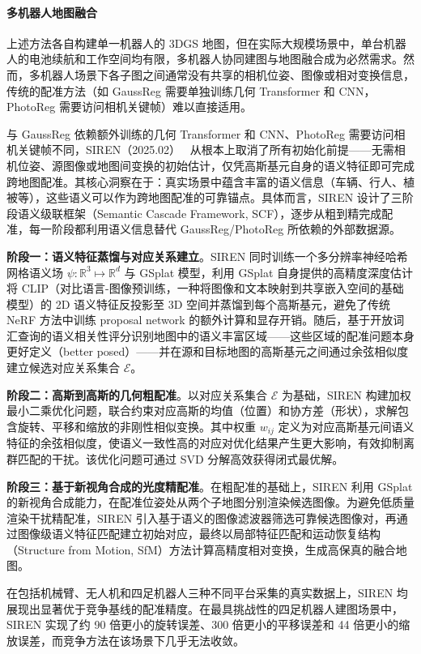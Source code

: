 \paragraph{多机器人地图融合}

上述方法各自构建单一机器人的 3DGS 地图，但在实际大规模场景中，单台机器人的电池续航和工作空间均有限，多机器人协同建图与地图融合成为必然需求。然而，多机器人场景下各子图之间通常没有共享的相机位姿、图像或相对变换信息，传统的配准方法（如 GaussReg 需要单独训练几何 Transformer 和 CNN，PhotoReg 需要访问相机关键帧）难以直接适用。

与 GaussReg 依赖额外训练的几何 Transformer 和 CNN、PhotoReg 需要访问相机关键帧不同，SIREN（2025.02）~\cite{2502_06519} 从根本上取消了所有初始化前提——无需相机位姿、源图像或地图间变换的初始估计，仅凭高斯基元自身的语义特征即可完成跨地图配准。其核心洞察在于：真实场景中蕴含丰富的语义信息（车辆、行人、植被等），这些语义可以作为跨地图配准的可靠锚点。具体而言，SIREN 设计了三阶段语义级联框架（Semantic Cascade Framework, SCF），逐步从粗到精完成配准，每一阶段都利用语义信息替代 GaussReg/PhotoReg 所依赖的外部数据源。

\textbf{阶段一：语义特征蒸馏与对应关系建立}。SIREN 同时训练一个多分辨率神经哈希网格语义场 $\psi: \mathbb{R}^3 \mapsto \mathbb{R}^d$ 与 GSplat 模型，利用 GSplat 自身提供的高精度深度估计将 CLIP（对比语言-图像预训练，一种将图像和文本映射到共享嵌入空间的基础模型）的 2D 语义特征反投影至 3D 空间并蒸馏到每个高斯基元，避免了传统 NeRF 方法中训练 proposal network 的额外计算和显存开销。随后，基于开放词汇查询的语义相关性评分识别地图中的语义丰富区域——这些区域的配准问题本身更好定义（better posed）——并在源和目标地图的高斯基元之间通过余弦相似度建立候选对应关系集合 $\mathcal{E}$。

\textbf{阶段二：高斯到高斯的几何粗配准}。以对应关系集合 $\mathcal{E}$ 为基础，SIREN 构建加权最小二乘优化问题，联合约束对应高斯的均值（位置）和协方差（形状），求解包含旋转、平移和缩放的非刚性相似变换。其中权重 $w_{ij}$ 定义为对应高斯基元间语义特征的余弦相似度，使语义一致性高的对应对优化结果产生更大影响，有效抑制离群匹配的干扰。该优化问题可通过 SVD 分解高效获得闭式最优解。

\textbf{阶段三：基于新视角合成的光度精配准}。在粗配准的基础上，SIREN 利用 GSplat 的新视角合成能力，在配准位姿处从两个子地图分别渲染候选图像。为避免低质量渲染干扰精配准，SIREN 引入基于语义的图像滤波器筛选可靠候选图像对，再通过图像级语义特征匹配建立初始对应，最终以局部特征匹配和运动恢复结构（Structure from Motion, SfM）方法计算高精度相对变换，生成高保真的融合地图。

在包括机械臂、无人机和四足机器人三种不同平台采集的真实数据上，SIREN 均展现出显著优于竞争基线的配准精度。在最具挑战性的四足机器人建图场景中，SIREN 实现了约 90 倍更小的旋转误差、300 倍更小的平移误差和 44 倍更小的缩放误差，而竞争方法在该场景下几乎无法收敛。

